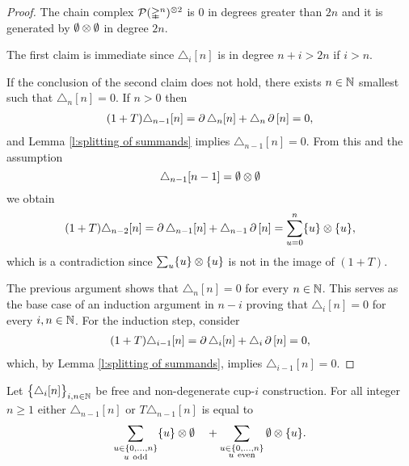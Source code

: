\begin{proof}
	The chain complex $\mathcal{P}(\mathbb{\Delta}^n)^{\otimes 2}$ is $0$ in degrees greater than $2n$ and it is generated by $\emptyset \otimes \emptyset$ in degree $2n$.

	The first claim is immediate since $\triangle_i[n]$ is in degree $n+i > 2n$ if $i > n$.

	If the conclusion of the second claim does not hold, there exists $n \in \mathbb{N}$ smallest such that $\triangle_n [n] = 0$.
	If $n > 0$ then
	\begin{align*}
	(1+T) \triangle_{n-1} [n] =
	\operatorname{\partial} \triangle_{n} [n] + \triangle_{n} \operatorname{\partial} \, [n] = 0,
	\end{align*}
	and Lemma \ref{l:splitting of summands} implies $\triangle_{n-1} [n] = 0$.
	From this and the assumption
	\[
	\triangle_{n-1}[n-1] = \emptyset \otimes \emptyset
	\]
	we obtain
	\begin{equation}
	\begin{split}
	(1+T)\triangle_{n-2} [n] =
	\operatorname{\partial} \triangle_{n-1} [n] + \triangle_{n-1} \operatorname{\partial} \, [n] =
	\sum_{u = 0}^n \{u\} \otimes \{u\},
	\end{split}
	\end{equation}
	which is a contradiction since $\sum_u \{u\} \otimes \{u\}$ is not in the image of $(1+T)$.

	The previous argument shows that $\triangle_n [n] = 0$ for every $n \in \mathbb{N}$.
	This serves as the base case of an induction argument in $n-i$ proving that $\triangle_i [n] = 0$ for every $i, n \in \mathbb{N}$.
	For the induction step, consider
	\begin{align*}
	(1+T) \triangle_{i-1} [n] =
	\operatorname{\partial} \triangle_{i} [n] + \triangle_{i} \operatorname{\partial}\, [n] = 0,
	\end{align*}
	which, by Lemma \ref{l:splitting of summands}, implies $\triangle_{i-1} [n] = 0$.
\end{proof}

\begin{lemma} \label{l:special case two}
	Let $\big\{ \triangle_i [n] \big\}_{i,n\in\mathbb{N}}$ be free and non-degenerate \mbox{cup-$i$} construction.
	For all integer $n \geq 1$ either $\triangle_{n-1} [n]$ or $T \triangle_{n-1} [n]$ is equal to
	\[
	\sum_{\substack{u \in \{0,\dots,n\} \\ u \ \mathrm{odd}}} \{u\} \otimes \emptyset
	\quad +
	\sum_{\substack{u \in \{0,\dots,n\} \\ u \ \mathrm{even}}} \emptyset \otimes \{u\}.
	\]
\end{lemma}

